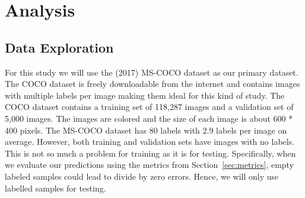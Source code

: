 \documentclass[12pt,journal,compsoc]{IEEEtran}
\begin{document}

\section{Analysis} %
\subsection{Data Exploration}









For this study we will use the (2017) MS-COCO\cite{MSCOCO} dataset as our primary dataset. The COCO dataset is freely downloadable from the internet and contains images with multiple labels per image making them ideal for this kind of study. The COCO dataset contains a training set of 118,287 images and a validation set of 5,000 images.  The images are colored and the size of each image is about 600 * 400 pixels.  The MS-COCO dataset has 80 labels with 2.9 labels per image on average.  However, both training and validation sets have images with no labels.  This is not so much a problem for training as it is for testing.  Specifically, when we evaluate our predictions using the metrics from Section~\ref{sec:metrics}, empty labeled samples could lead to divide by zero errors.  Hence, we will only use labelled samples for testing. 
\end{document}
